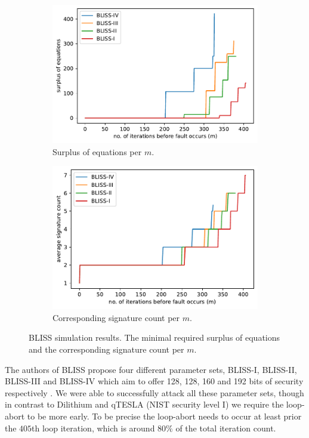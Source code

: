 \begin{figure}%
	\centering%
	\begin{subfigure}{.5\textwidth}%
		\centering%
		\includegraphics[width=.95\linewidth]{plots/bliss_surplus}%
		\caption{Surplus of equations per $m$.}%
		\label{fig:blisssurplus}%
	\end{subfigure}%
	\begin{subfigure}{.5\textwidth}%
		\centering%
		\includegraphics[width=.95\linewidth]{plots/bliss_surplus_sigcount}%
		\caption{Corresponding signature count per $m$.}%
		\label{fig:blisssurplussigcount}%
	\end{subfigure}%
%
	\caption{BLISS simulation results. The minimal required surplus of equations and the corresponding signature count per $m$.}
	\label{fig:blisssurplusandsigcount}%
\end{figure}


The authors of BLISS propose four different parameter sets, BLISS-I, BLISS-II, BLISS-III and BLISS-IV which aim to offer 128, 128, 160 and 192 bits of security respectively \cite[pp.~23--24]{bliss_full}. We were able to successfully attack all these parameter sets, though in contrast to Dilithium and qTESLA (NIST security level I) %
we require the loop-abort to be more early. To be precise the loop-abort needs to occur at least prior the $405$th loop iteration, which is  around $80\%$ of the total iteration count.

